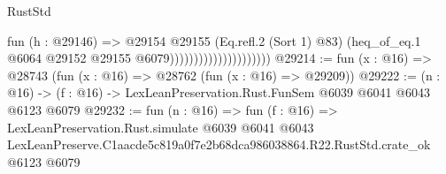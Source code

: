 \begin{lexlean}{RustStd}
\begin{coremodule}
                                          fun (h : @29146) =>
                                          @29154
                                            @29155
                                            (Eq.refl.{2} (Sort 1) @83)
                                            (heq_of_eq.{1}
                                              @6064
                                              @29152
                                              @29155
                                              @6079)))))))))))))))))))))
@29214 := fun (x : @16) => @28743 (fun (x : @16) => @28762 (fun (x : @16) => @29209))
@29222 := (n : @16) -> (f : @16) -> LexLeanPreservation.Rust.FunSem @6039 @6041 @6043 @6123 @6079
@29232 := fun (n : @16) =>
  fun (f : @16) =>
  LexLeanPreservation.Rust.simulate
    @6039
    @6041
    @6043
    LexLeanPreserve.C1aacde5c819a0f7e2b68dca986038864.R22.RustStd.crate_ok
    @6123
    @6079
\end{coremodule}
\end{lexlean}
